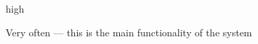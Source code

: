 \documentclass[11pt]{scrartcl}
\begin{document}
\begin{description}[leftmargin=!,labelwidth=\widthof{\bfseries Frequency of use:}]
	\item[Priority:] high
	\item[Frequency of use:] Very often --- this is the main functionality of the system

\end{description}
\end{document}
